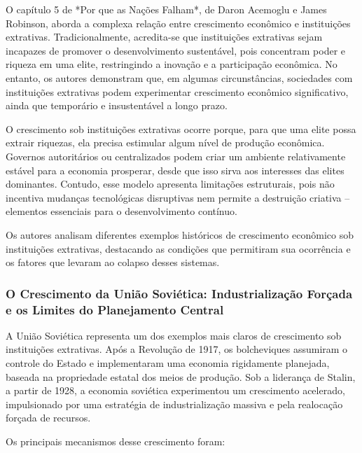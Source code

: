 \documentclass[a4paper,12pt]{article}[abntex2]
\begin{document}
O capítulo 5 de *Por que as Nações Falham*, de Daron Acemoglu e James Robinson, aborda a complexa relação entre crescimento econômico e instituições extrativas. Tradicionalmente, acredita-se que instituições extrativas sejam incapazes de promover o desenvolvimento sustentável, pois concentram poder e riqueza em uma elite, restringindo a inovação e a participação econômica. No entanto, os autores demonstram que, em algumas circunstâncias, sociedades com instituições extrativas podem experimentar crescimento econômico significativo, ainda que temporário e insustentável a longo prazo.

O crescimento sob instituições extrativas ocorre porque, para que uma elite possa extrair riquezas, ela precisa estimular algum nível de produção econômica. Governos autoritários ou centralizados podem criar um ambiente relativamente estável para a economia prosperar, desde que isso sirva aos interesses das elites dominantes. Contudo, esse modelo apresenta limitações estruturais, pois não incentiva mudanças tecnológicas disruptivas nem permite a destruição criativa – elementos essenciais para o desenvolvimento contínuo.

Os autores analisam diferentes exemplos históricos de crescimento econômico sob instituições extrativas, destacando as condições que permitiram sua ocorrência e os fatores que levaram ao colapso desses sistemas.

\subsubsection{\textbf{O Crescimento da União Soviética: Industrialização Forçada e os Limites do Planejamento Central}}

A União Soviética representa um dos exemplos mais claros de crescimento sob instituições extrativas. Após a Revolução de 1917, os bolcheviques assumiram o controle do Estado e implementaram uma economia rigidamente planejada, baseada na propriedade estatal dos meios de produção. Sob a liderança de Stalin, a partir de 1928, a economia soviética experimentou um crescimento acelerado, impulsionado por uma estratégia de industrialização massiva e pela realocação forçada de recursos.

Os principais mecanismos desse crescimento foram:
\end{document}
